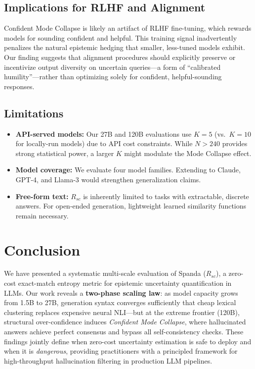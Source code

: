 \documentclass[11pt]{article}
\begin{document}
\subsection{Implications for RLHF and Alignment}

Confident Mode Collapse is likely an artifact of RLHF fine-tuning, which rewards models for sounding confident and helpful. This training signal inadvertently penalizes the natural epistemic hedging that smaller, less-tuned models exhibit. Our finding suggests that alignment procedures should explicitly preserve or incentivize output diversity on uncertain queries---a form of ``calibrated humility''---rather than optimizing solely for confident, helpful-sounding responses.

\subsection{Limitations}

\begin{itemize}
    \item \textbf{API-served models:} Our 27B and 120B evaluations use $K=5$ (vs.\ $K=10$ for locally-run models) due to API cost constraints. While $N > 240$ provides strong statistical power, a larger $K$ might modulate the Mode Collapse effect.
    \item \textbf{Model coverage:} We evaluate four model families. Extending to Claude, GPT-4, and Llama-3 would strengthen generalization claims.
    \item \textbf{Free-form text:} $R_{sc}$ is inherently limited to tasks with extractable, discrete answers. For open-ended generation, lightweight learned similarity functions remain necessary.
\end{itemize}

\section{Conclusion}

We have presented a systematic multi-scale evaluation of Spanda ($R_{sc}$), a zero-cost exact-match entropy metric for epistemic uncertainty quantification in LLMs. Our work reveals a \textbf{two-phase scaling law}: as model capacity grows from 1.5B to 27B, generation syntax converges sufficiently that cheap lexical clustering replaces expensive neural NLI---but at the extreme frontier (120B), structural over-confidence induces \textit{Confident Mode Collapse}, where hallucinated answers achieve perfect consensus and bypass all self-consistency checks. These findings jointly define when zero-cost uncertainty estimation is safe to deploy and when it is \textit{dangerous}, providing practitioners with a principled framework for high-throughput hallucination filtering in production LLM pipelines.
\end{document}
